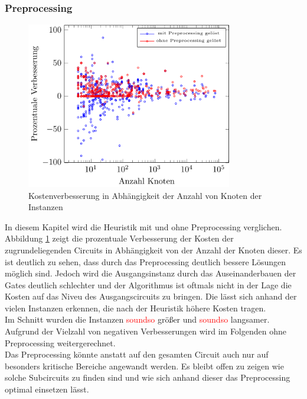 \documentclass[11pt, a4paper, german]{article}
\begin{document}
\subsubsection{Preprocessing}
\begin{figure}[h]
		\centering
		\includegraphics[width = 9cm]{pictures/tex_files/analysis/decomp_test}
		\caption{Kostenverbesserung in Abh\"angigkeit der Anzahl von Knoten der Instanzen}
		\label{bild:decomp_test}
\end{figure}
In diesem Kapitel wird die Heuristik mit und ohne Preprocessing verglichen. Abbildung \ref{bild:decomp_test} zeigt die prozentuale Verbesserung der Kosten der zugrundeliegenden Circuits in Abh\"angigkeit von der Anzahl der Knoten dieser. Es ist deutlich zu sehen, dass durch das Preprocessing deutlich bessere L\"osungen m\"oglich sind. Jedoch wird die Ausgangsinstanz durch das Auseinanderbauen der Gates deutlich schlechter und der Algorithmus ist oftmals nicht in der Lage die Kosten auf das Niveu des Ausgangscircuits zu bringen. Die l\"asst sich anhand der vielen Instanzen erkennen, die nach der Heuristik h\"ohere Kosten tragen.\\
Im Schnitt wurden die Instanzen \textcolor{red}{soundso} grö{\ss}er und \textcolor{red}{soundso} langsamer. Aufgrund der Vielzahl von negativen Verbesserungen wird im Folgenden ohne Preprocessing weitergerechnet. \\
Das Preprocessing k\"onnte anstatt auf den gesamten Circuit auch nur auf besonders kritische Bereiche angewandt werden. Es bleibt offen zu zeigen wie solche Subcircuits zu finden sind und wie sich anhand dieser das Preprocessing optimal einsetzen l\"asst.
\end{document}

